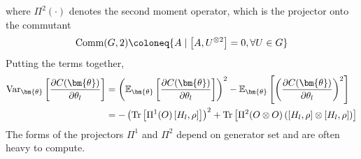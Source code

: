 \documentclass[a4paper,onecolumn,notitlepage,nofootinbib,longbibliography,superscriptaddress, floatfix, pra, aps, 10pt]{revtex4-2}
\newcommand{\vttheta}{{\bm{\theta}}}
\begin{document}
where $\Pi^2(\cdot)$ denotes the second moment operator, which is the projector onto the commutant \begin{equation}
    \text{Comm}(G,2)\coloneq \{A \mid \comm{A}{U^{\otimes 2}} =0, \forall U \in G\}
\end{equation}Putting the terms together, 
\begin{align}
\text{Var}_\vttheta \left[\frac{\partial C(\vttheta)}{\partial {\theta_l}}\right] &= \left(\mathbb{E}_\vttheta \left[\frac{\partial C(\vttheta)}{\partial {\theta_l}}\right]\right)^2 - \mathbb{E}_\vttheta \left[\left(\frac{\partial C(\vttheta)}{\partial {\theta_l}}\right)^2\right] \\
&= - \left(\Tr\left[\Pi^1(O)\left[H_l,\rho\right]  \right]\right)^2 + \Tr\left[\Pi^2(O\otimes O) \left(\left[H_l,\rho\right] \otimes \left[H_l,\rho\right] \right)\right]
\end{align}
The forms of the projectors $\Pi^1$ and $\Pi^2$ depend on generator set and are often heavy to compute. 
\end{document}
